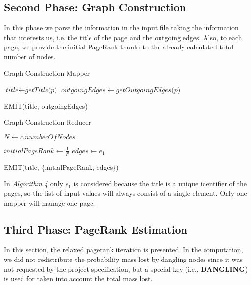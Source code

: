 \subsection{Second Phase: Graph Construction}
In this phase we parse the information in the input file taking the information that interests us, i.e. the title of the page and the outgoing edges. Also, to each page, we provide the initial PageRank thanks to the already calculated total number of nodes. 

\begin{algorithm}[H]
	\caption{Graph Construction Mapper}\label{Mapper}
		\begin{algorithmic}[1]
					\State $\textit{title} \gets \textit{getTitle(p)}$
					\State $ outgoingEdges \gets \textit{getOutgoingEdges(p)}$
		
					\State EMIT(title, outgoingEdges)
			\EndProcedure
			
			
	\end{algorithmic}
\end{algorithm}

\begin{algorithm}[H]
	\caption{Graph Construction Reducer}\label{Reducer}
		\begin{algorithmic}[1]
				\State $N \gets c.numberOfNodes$
			\EndProcedure
		
					\State $\textit{initialPageRank} \gets \frac{1}{N} $
					\State $ \textit{edges} \gets e_1$
		
					\State EMIT(title, \{initialPageRank, edges\})
				
			\EndProcedure
		\end{algorithmic}
\end{algorithm}

\noindent In \textit{Algorithm 4} only $e_1$ is considered because the title is a unique identifier of the pages, so the list of input values will always consist of a single element. Only one mapper will manage one page.

\subsection{Third Phase: PageRank Estimation}
In this section, the relaxed pagerank iteration is presented. In the computation, we did not redistribute the probability mass lost by dangling nodes since it was not requested by the project specification, but a special key (i.e., \textbf{DANGLING}) is used for taken into account the total mass lost.

